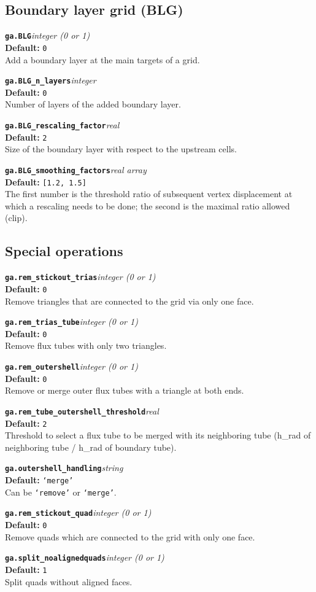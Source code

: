 \documentclass[10pt,a4paper]{article}
\newcommand{\sw}[4]{%
  \par\vspace{0.7em}%
  \begin{minipage}{\linewidth}\raggedright
    \textbf{\texttt{#1}}\hfill\textit{#2}\\[0.1em]
    \textbf{Default:} #3\\[0.1em]
    #4\par
    \vspace{0.3em}{\color{swgrey}\hrule}
  \end{minipage}\par}
\begin{document}
\subsection*{Boundary layer grid (BLG)}
\sw{ga.BLG}{integer (0 or 1)}{\texttt{0}}{Add a boundary layer at the main targets of a grid.}
\sw{ga.BLG_n_layers}{integer}{\texttt{0}}{Number of layers of the added boundary layer.}
\sw{ga.BLG_rescaling_factor}{real}{\texttt{2}}{Size of the boundary layer with respect to the upstream cells.}
\sw{ga.BLG_smoothing_factors}{real array}{\texttt{[1.2, 1.5]}}{The first number is the threshold ratio of subsequent vertex displacement at which a rescaling needs to be done; the second is the maximal ratio allowed (clip).}

\subsection*{Special operations}
\sw{ga.rem_stickout_trias}{integer (0 or 1)}{\texttt{0}}{Remove triangles that are connected to the grid via only one face.}
\sw{ga.rem_trias_tube}{integer (0 or 1)}{\texttt{0}}{Remove flux tubes with only two triangles.}
\sw{ga.rem_outershell}{integer (0 or 1)}{\texttt{0}}{Remove or merge outer flux tubes with a triangle at both ends.}
\sw{ga.rem_tube_outershell_threshold}{real}{\texttt{2}}{Threshold to select a flux tube to be merged with its neighboring tube (h\_rad of neighboring tube / h\_rad of boundary tube).}
\sw{ga.outershell_handling}{string}{\texttt{`merge'}}{Can be \texttt{`remove'} or \texttt{`merge'}.}
\sw{ga.rem_stickout_quad}{integer (0 or 1)}{\texttt{0}}{Remove quads which are connected to the grid with only one face.}
\sw{ga.split_noalignedquads}{integer (0 or 1)}{\texttt{1}}{Split quads without aligned faces.}
\end{document}

